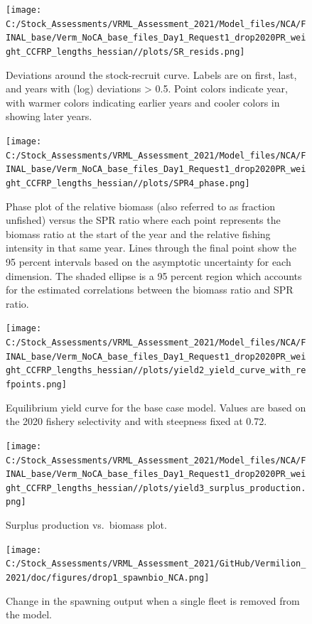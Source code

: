 \documentclass[
  english,
  a4paper,
]{article}
\begin{document}
\begin{figure}
\centering
\texttt{[image: C:/Stock\_Assessments/VRML\_Assessment\_2021/Model\_files/NCA/FINAL\_base/Verm\_NoCA\_base\_files\_Day1\_Request1\_drop2020PR\_weight\_CCFRP\_lengths\_hessian//plots/SR\_resids.png]}
\caption{Deviations around the stock-recruit curve. Labels are on first, last, and years with (log) deviations \textgreater{} 0.5. Point colors indicate year, with warmer colors indicating earlier years and cooler colors in showing later years.\label{fig:bh-resids}}
\end{figure}

\FloatBarrier

\begin{figure}
\centering
\texttt{[image: C:/Stock\_Assessments/VRML\_Assessment\_2021/Model\_files/NCA/FINAL\_base/Verm\_NoCA\_base\_files\_Day1\_Request1\_drop2020PR\_weight\_CCFRP\_lengths\_hessian//plots/SPR4\_phase.png]}
\caption{Phase plot of the relative biomass (also referred to as fraction unfished) versus the SPR ratio where each point represents the biomass ratio at the start of the year and the relative fishing intensity in that same year. Lines through the final point show the 95 percent intervals based on the asymptotic uncertainty for each dimension. The shaded ellipse is a 95 percent region which accounts for the estimated correlations between the biomass ratio and SPR ratio.\label{fig:phase}}
\end{figure}

\begin{figure}
\centering
\texttt{[image: C:/Stock\_Assessments/VRML\_Assessment\_2021/Model\_files/NCA/FINAL\_base/Verm\_NoCA\_base\_files\_Day1\_Request1\_drop2020PR\_weight\_CCFRP\_lengths\_hessian//plots/yield2\_yield\_curve\_with\_refpoints.png]}
\caption{Equilibrium yield curve for the base case model. Values are based on the 2020
fishery selectivity and with steepness fixed at 0.72.\label{fig:yield2}}
\end{figure}

\begin{figure}
\centering
\texttt{[image: C:/Stock\_Assessments/VRML\_Assessment\_2021/Model\_files/NCA/FINAL\_base/Verm\_NoCA\_base\_files\_Day1\_Request1\_drop2020PR\_weight\_CCFRP\_lengths\_hessian//plots/yield3\_surplus\_production.png]}
\caption{Surplus production vs.~biomass plot.\label{fig:yield3}}
\end{figure}

\FloatBarrier

\begin{figure}
\centering
\texttt{[image: C:/Stock\_Assessments/VRML\_Assessment\_2021/GitHub/Vermilion\_2021/doc/figures/drop1\_spawnbio\_NCA.png]}
\caption{Change in the spawning output when a single fleet is removed from the model.\label{fig:drop-spawnbio}}
\end{figure}
\end{document}
